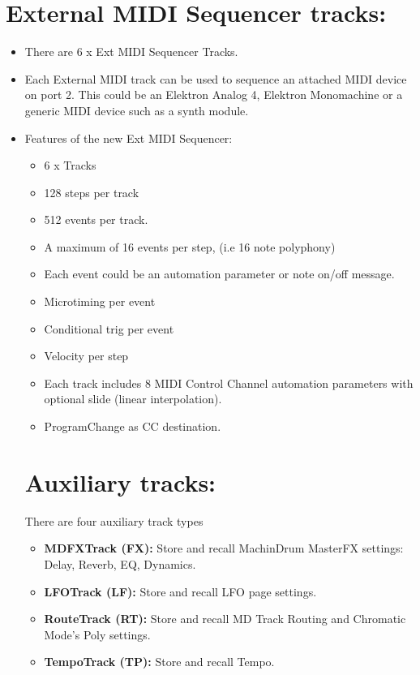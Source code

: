 \section{External MIDI Sequencer tracks:}
\begin{itemize}
\item There are 6 x Ext MIDI Sequencer Tracks.
\item Each External MIDI track can be used to sequence an attached MIDI device on port 2. This could be an Elektron Analog 4, Elektron Monomachine or a generic MIDI device such as a synth module.
\item
    Features of the new Ext MIDI Sequencer:
\begin{itemize}
    \item 6 x Tracks
    \item 128 steps per track
	\item 512 events per track.
    \item A maximum of 16 events per step, (i.e 16 note polyphony)
	\item Each event could be an automation parameter or note on/off message.
    \item Microtiming per event
    \item Conditional trig per event
    \item Velocity per step
    \item Each track includes 8 MIDI Control Channel automation parameters with optional slide (linear interpolation).
    \item ProgramChange as CC destination.
\end{itemize}

\section{Auxiliary tracks:}
There are four auxiliary track types
 \begin{itemize}
 \item \textbf{MDFXTrack (FX):} Store and recall MachinDrum MasterFX settings: Delay, Reverb, EQ, Dynamics.
 \item \textbf{LFOTrack (LF):} Store and recall LFO page settings.
 \item \textbf{RouteTrack (RT):} Store and recall MD Track Routing and Chromatic Mode's Poly settings.
 \item \textbf{TempoTrack (TP):} Store and recall Tempo.

 
    \end{itemize}
\end{itemize}

